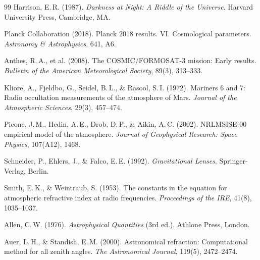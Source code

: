 \documentclass[12pt,a4paper]{article}
\begin{document}
\begin{thebibliography}{99}
Harrison, E.\,R. (1987).
\newblock \textit{Darkness at Night: A Riddle of the Universe}.
\newblock Harvard University Press, Cambridge, MA.

Planck Collaboration (2018).
\newblock Planck 2018 results. VI. Cosmological parameters.
\newblock \textit{Astronomy \& Astrophysics}, 641, A6.
\newblock {}

Anthes, R.\,A., et al. (2008).
\newblock The COSMIC/FORMOSAT-3 mission: Early results.
\newblock \textit{Bulletin of the American Meteorological Society}, 89(3),
  313--333.
\newblock {}

Kliore, A., Fjeldbo, G., Seidel, B.\,L., \& Rasool, S.\,I. (1972).
\newblock Mariners 6 and 7: Radio occultation measurements of the atmosphere
  of Mars.
\newblock \textit{Journal of the Atmospheric Sciences}, 29(3), 457--474.

Picone, J.\,M., Hedin, A.\,E., Drob, D.\,P., \& Aikin, A.\,C. (2002).
\newblock NRLMSISE-00 empirical model of the atmosphere.
\newblock \textit{Journal of Geophysical Research: Space Physics}, 107(A12),
  1468.
\newblock {}

Schneider, P., Ehlers, J., \& Falco, E.\,E. (1992).
\newblock \textit{Gravitational Lenses}.
\newblock Springer-Verlag, Berlin.
\newblock {}

Smith, E.\,K., \& Weintraub, S. (1953).
\newblock The constants in the equation for atmospheric refractive index at
  radio frequencies.
\newblock \textit{Proceedings of the IRE}, 41(8), 1035--1037.
\newblock {}


Allen, C.\,W. (1976).
\newblock \textit{Astrophysical Quantities} (3rd ed.).
\newblock Athlone Press, London.

Auer, L.\,H., \& Standish, E.\,M. (2000).
\newblock Astronomical refraction: Computational method for all zenith angles.
\newblock \textit{The Astronomical Journal}, 119(5), 2472--2474.
\newblock {}


\end{thebibliography}
\end{document}
